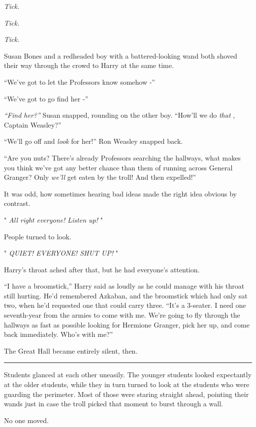 \emph{Tick.}

\emph{Tick.}

\emph{Tick.}

Susan Bones and a redheaded boy with a battered-looking wand both shoved
their way through the crowd to Harry at the same time.

``We've got to let the Professors know somehow -''

``We've got to go find her -''

\emph{``Find her?''} Susan snapped, rounding on the other boy. ``How'll
we do \emph{that} , Captain Weasley?''

``We'll go off and \emph{look} for her!'' Ron Weasley snapped back.

``Are you nuts? There's already Professors searching the hallways, what
makes you think we've got any better chance than them of running across
General Granger? Only \emph{we'll} get eaten by the troll! And then
expelled!''

It was odd, how sometimes hearing bad ideas made the right idea obvious
by contrast.

" \emph{All right everyone! Listen up!} "

People turned to look.

" \emph{QUIET! EVERYONE! SHUT UP!} "

Harry's throat ached after that, but he had everyone's attention.

``I have a broomstick,'' Harry said as loudly as he could manage with
his throat still hurting. He'd remembered Azkaban, and the broomstick
which had only sat two, when he'd requested one that could carry three.
``It's a 3-seater. I need one seventh-year from the armies to come with
me. We're going to fly through the hallways as fast as possible looking
for Hermione Granger, pick her up, and come back immediately. Who's with
me?''

The Great Hall became entirely silent, then.

\begin{center}\rule{3in}{0.4pt}\end{center}

Students glanced at each other uneasily. The younger students looked
expectantly at the older students, while they in turn turned to look at
the students who were guarding the perimeter. Most of those were staring
straight ahead, pointing their wands just in case the troll picked that
moment to burst through a wall.

No one moved.

